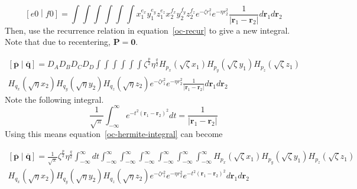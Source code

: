 \documentclass[twoside,10pt,draft]{article}
\begin{document}
\begin{equation}
  \left[e0\middle|f0\right] = \int\int\int\int\int\int x_1^{e_x}y_1^{e_y} z_1^{e_z} x_2^{f_x} y_2^{f_y}z_2^{f_z} e^{-\zeta r_1^2}e^{-\eta r_2^2}\frac{1}{\left|\mathbf{r}_1 - \mathbf{r}_2\right|} d\mathbf{r}_1 d\mathbf{r}_2
\end{equation}
Then, use the recurrence relation in equation~\ref{oc-recur} to give a new integral. Note that due to recentering, $\mathbf{P} = \mathbf{0}$.

\begin{multline}
  \left[\overline{\mathbf{p}}\middle|\overline{\mathbf{q}}\right] = D_A D_B D_C D_D\int\int\int\int\int\int \zeta^{\frac{p}{2}} \eta^{\frac{q}{2}} H_{p_x}\left(\sqrt{\zeta} x_1\right) H_{p_y}\left(\sqrt{\zeta} y_1\right) H_{p_z}\left(\sqrt{\zeta} z_1\right) \\
  H_{q_x}\left(\sqrt{\eta}x_2\right)H_{q_y}\left(\sqrt{\eta}y_2\right)H_{q_z}\left(\sqrt{\eta}z_2\right) e^{-\zeta r_1^2}e^{-\eta r_2^2} \frac{1}{\left|\mathbf{r}_1 - \mathbf{r}_2\right|} d\mathbf{r}_1 d\mathbf{r}_2
  \label{oc-hermite-integral}
\end{multline}
Note the following integral.
\begin{equation}
  \frac{1}{\sqrt{\pi}} \int_{-\infty}^\infty e^{-t^2\left(\mathbf{r}_1 - \mathbf{r}_2\right)^2} dt = \frac{1}{\left|\mathbf{r}_1 - \mathbf{r}_2\right|}
  \label{jesus-kernel}
\end{equation}
Using this means equation~\ref{oc-hermite-integral} can become

\begin{multline}
  \left[\overline{\mathbf{p}}\middle|\overline{\mathbf{q}}\right] = \frac{1}{\sqrt{\pi}} \zeta^{\frac{p}{2}} \eta^{\frac{q}{2}} \int_{-\infty}^\infty dt \int_{-\infty}^\infty \int_{-\infty}^\infty \int_{-\infty}^\infty \int_{-\infty}^\infty \int_{-\infty}^\infty \int_{-\infty}^\infty H_{p_x}\left(\sqrt{\zeta} x_1\right) H_{p_y}\left(\sqrt{\zeta} y_1\right) H_{p_z}\left(\sqrt{\zeta} z_1\right) \\
  H_{q_x}\left(\sqrt{\eta}x_2\right)H_{q_y}\left(\sqrt{\eta}y_2\right)H_{q_z}\left(\sqrt{\eta}z_2\right) e^{-\zeta r_1^2}e^{-\eta r_2^2} e^{-t^2\left(\mathbf{r}_1 - \mathbf{r}_2\right)^2} d\mathbf{r}_1 d\mathbf{r}_2
\end{multline}
\end{document}
